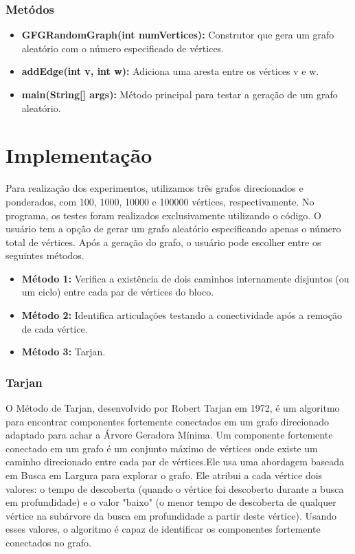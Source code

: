 \subsubsection{Metódos}
\begin{itemize}
    \item \textbf{GFGRandomGraph(int numVertices):} Construtor que gera um grafo aleatório com o número especificado de vértices.
    \item \textbf{addEdge(int v, int w):} Adiciona uma aresta entre os vértices v e w.
    \item \textbf{main(String[] args):} Método principal para testar a geração de um grafo aleatório.
    \end{itemize}

    
\section{\esp Implementação}
Para realização dos experimentos, utilizamos três grafos direcionados e ponderados, com 100, 1000, 10000 e 100000 vértices, respectivamente. No programa, os testes foram realizados exclusivamente utilizando o código. O usuário tem a opção de gerar um grafo aleatório especificando apenas o número total de vértices. Após a geração do grafo, o usuário pode escolher entre os seguintes métodos.
\begin{itemize}
    \item \textbf{Método 1:} Verifica a existência de dois caminhos internamente disjuntos (ou um ciclo) entre cada par de vértices do bloco.
    \item \textbf{Método 2:} Identifica articulações testando a conectividade após a remoção de cada vértice.
    \item \textbf{Método 3:} Tarjan.
\end{itemize}

\subsubsection{Tarjan}
O Método de Tarjan, desenvolvido por Robert Tarjan em 1972, é um algoritmo para encontrar componentes fortemente conectados em um grafo direcionado adaptado para achar a Árvore Geradora Mínima. Um componente fortemente conectado em um grafo é um conjunto máximo de vértices onde existe um caminho direcionado entre cada par de vértices.Ele usa uma abordagem baseada em Busca em Largura para explorar o grafo. Ele atribui a cada vértice dois valores: o tempo de descoberta (quando o vértice foi descoberto durante a busca em profundidade) e o valor "baixo" (o menor tempo de descoberta de qualquer vértice na subárvore da busca em profundidade a partir deste vértice). Usando esses valores, o algoritmo é capaz de identificar os componentes fortemente conectados no grafo.

